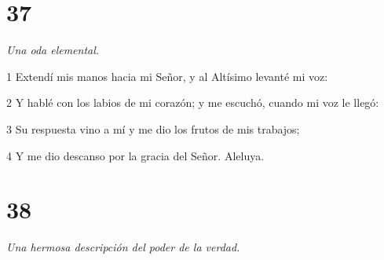 \chapter{37}

\par \textit{Una oda elemental.}

\par 1 Extendí mis manos hacia mi Señor, y al Altísimo levanté mi voz:
\par 2 Y hablé con los labios de mi corazón; y me escuchó, cuando mi voz le llegó:
\par 3 Su respuesta vino a mí y me dio los frutos de mis trabajos;
\par 4 Y me dio descanso por la gracia del Señor. Aleluya.



\chapter{38}

\par \textit{Una hermosa descripción del poder de la verdad.}

